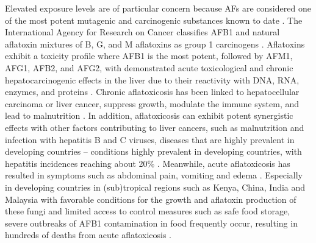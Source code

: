 Elevated exposure levels are of particular concern because AFs are considered one of the most potent mutagenic and carcinogenic substances known to date \citep{eskola2020worldwide}. The International Agency for Research on Cancer classifies AFB1 and natural aflatoxin mixtures of B, G, and M aflatoxins as group 1 carcinogens \citep{IARC2006}. Aflatoxins exhibit a toxicity profile where AFB1 is the most potent, followed by AFM1, AFG1, AFB2, and AFG2, with demonstrated acute toxicological and chronic hepatocarcinogenic effects in the liver due to their reactivity with DNA, RNA, enzymes, and proteins \citep{haque2020mycotoxin}. Chronic aflatoxicosis has been linked to hepatocellular carcinoma or liver cancer, suppress growth, modulate the immune system, and lead to malnutrition \citep{rushing2019aflatoxin, IARC2006, haque2020mycotoxin}. In addition, aflatoxicosis can exhibit potent synergistic effects with other factors contributing to liver cancers, such as malnutrition and infection with hepatitis B and C viruses, diseases that are highly prevalent in developing countries -- conditions highly prevalent in developing countries, with hepatitis incidences reaching about 20\% \citep{williams2004human}. Meanwhile, acute aflatoxicosis has resulted in symptoms such as abdominal pain, vomiting and edema \citep{eskola2020worldwide}. Especially in developing countries in (sub)tropical regions such as Kenya, China, India and Malaysia with favorable conditions for the growth and aflatoxin production of these fungi and limited access to control measures such as safe food storage, severe outbreaks of AFB1 contamination in food frequently occur, resulting in hundreds of deaths from acute aflatoxicosis \citep{azziz2005case, eskola2020worldwide, haque2020mycotoxin}. 


